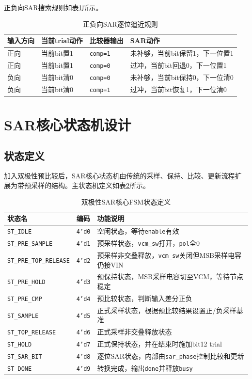 正负向SAR搜索规则如表\ref{tab:bipolar_sar_rule}所示。
\begin{table}[H]
\centering
\caption{正负向SAR逐位逼近规则}
\label{tab:bipolar_sar_rule}
\begin{tabular}{llll}
\toprule
输入方向 & 当前trial动作 & 比较器输出 & SAR动作 \\
\midrule
正向 & 当前bit置1 & \texttt{comp=1} & 未补够，当前bit保留1，下一位置1 \\
正向 & 当前bit置1 & \texttt{comp=0} & 过冲，当前bit回退0，下一位置1 \\
负向 & 当前bit清0 & \texttt{comp=0} & 未补够，当前bit保持0，下一位清0 \\
负向 & 当前bit清0 & \texttt{comp=1} & 过冲，当前bit恢复1，下一位清0 \\
\bottomrule
\end{tabular}
\end{table}

\section{SAR核心状态机设计}

\subsection{状态定义}

加入双极性预比较后，SAR核心状态机由传统的采样、保持、比较、更新流程扩展为带预采样的结构。主状态机定义如表\ref{tab:bipolar_fsm_state}所示。
\begin{table}[H]
\centering
\caption{双极性SAR核心FSM状态定义}
\label{tab:bipolar_fsm_state}
\begin{tabular}{lll}
\toprule
状态名 & 编码 & 功能说明 \\
\midrule
\texttt{ST\_IDLE} & \texttt{4'd0} & 空闲状态，等待\texttt{enable}有效 \\
\texttt{ST\_PRE\_SAMPLE} & \texttt{4'd1} & 预采样状态，\texttt{vcm\_sw}打开，\texttt{pol}全0 \\
\texttt{ST\_PRE\_TOP\_RELEASE} & \texttt{4'd2} & 预采样非交叠释放，\texttt{vcm\_sw}关闭但MSB采样电容仍接VIN \\
\texttt{ST\_PRE\_HOLD} & \texttt{4'd3} & 预保持状态，MSB采样电容切至VCM，等待节点稳定 \\
\texttt{ST\_PRE\_CMP} & \texttt{4'd4} & 预比较状态，判断输入差分正负 \\
\texttt{ST\_SAMPLE} & \texttt{4'd5} & 正式采样状态，根据预比较结果设置正/负采样基准 \\
\texttt{ST\_TOP\_RELEASE} & \texttt{4'd6} & 正式采样非交叠释放状态 \\
\texttt{ST\_HOLD} & \texttt{4'd7} & 正式保持状态，并在结束时施加bit12 trial \\
\texttt{ST\_SAR\_BIT} & \texttt{4'd8} & 逐位SAR状态，内部由\texttt{sar\_phase}控制比较和更新 \\
\texttt{ST\_DONE} & \texttt{4'd9} & 转换完成，输出\texttt{done}并释放\texttt{busy} \\
\bottomrule
\end{tabular}
\end{table}

